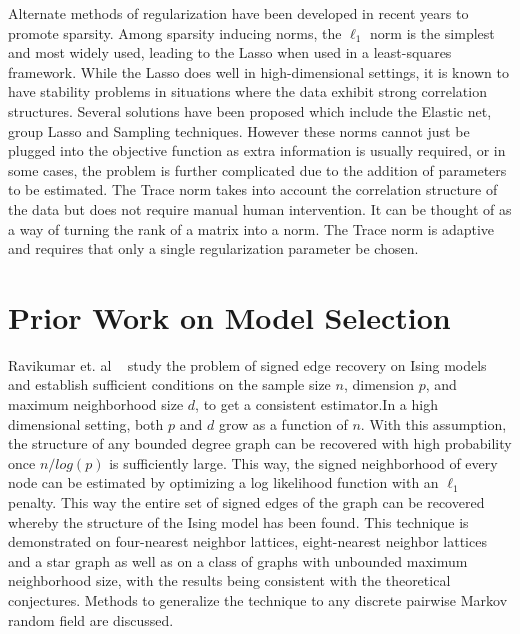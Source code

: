 \documentclass[11pt]{article}
\begin{document}
Alternate methods of regularization have been developed in recent years to promote sparsity. Among sparsity inducing norms, the $\ell_1$ norm is the simplest and most widely used, leading to the Lasso when used in a least-squares framework. While the Lasso does well in high-dimensional settings, it is known to have stability problems in situations where the data exhibit strong correlation structures. Several solutions have been proposed which include the Elastic net, group Lasso and Sampling techniques. However these norms cannot just be plugged into the objective function as extra information is usually required, or in some cases, the problem is further complicated due to the addition of parameters to be estimated. The Trace norm takes into account the correlation structure of the data but does not require manual human intervention. It can be thought of as a way of turning the rank of a matrix into a norm. The Trace norm is adaptive and requires that only a single regularization parameter be chosen. 	

\section{Prior Work on Model Selection}
Ravikumar et. al ~\cite{ravikumar2010high} study the problem of signed edge recovery on Ising models and establish sufficient conditions on the sample size $n$, dimension $p$, and maximum neighborhood size $d$, to get a consistent estimator.In a high dimensional setting, both $p$ and $d$ grow as a function of $n$. With this assumption, the structure of any bounded degree graph can be recovered with high probability once $n/log(p)$ is sufficiently large. This way, the signed neighborhood of every node can be estimated by optimizing a log likelihood function with an $\ell_1$ penalty. This way the entire set of signed edges of the graph can be recovered whereby the structure of the Ising model has been found. This technique is demonstrated on four-nearest neighbor lattices, eight-nearest neighbor lattices and a star graph as well as on a class of graphs with unbounded maximum neighborhood size, with the results being consistent with the theoretical conjectures. Methods to generalize the technique to any discrete pairwise Markov random field are discussed.\\
\end{document}
